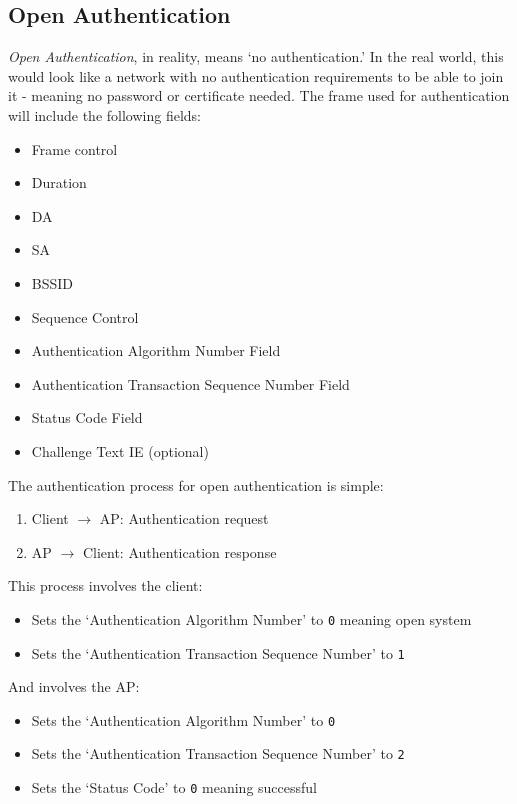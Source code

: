 \subsection{Open Authentication}
\textit{Open Authentication}, in reality, means `no authentication.' In the real world, this would look like a network with no authentication requirements to be able to join it - meaning no password or certificate needed. The frame used for authentication will include the following fields:
\begin{itemize}
    \item Frame control
    \item Duration
    \item DA
    \item SA
    \item BSSID
    \item Sequence Control
    \item Authentication Algorithm Number Field
    \item Authentication Transaction Sequence Number Field
    \item Status Code Field
    \item Challenge Text IE (optional)
\end{itemize}

The authentication process for open authentication is simple:
\begin{enumerate}
    \item Client $\rightarrow$ AP: Authentication request
    \item AP $\rightarrow$ Client: Authentication response
\end{enumerate}

This process involves the client:
\begin{itemize}
    \item Sets the `Authentication Algorithm Number' to \verb|0| meaning open system
    \item Sets the `Authentication Transaction Sequence Number' to \verb|1|
\end{itemize}

And involves the AP:
\begin{itemize}
    \item Sets the `Authentication Algorithm Number' to \verb|0|
    \item Sets the `Authentication Transaction Sequence Number' to \verb|2|
    \item Sets the `Status Code' to \verb|0| meaning successful
\end{itemize}


